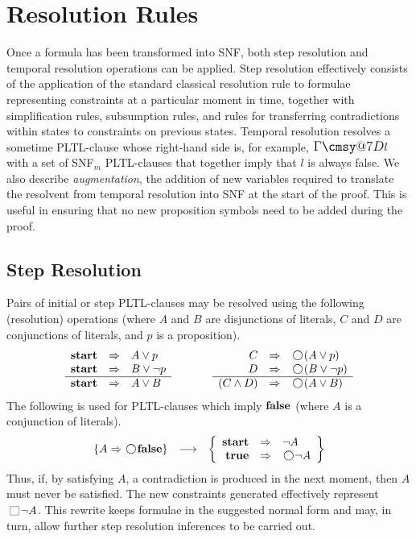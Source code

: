 \documentclass[nohyperref]{acmtrans2f}
\makeatletter
\def\sometime{\mathord{\hbox{\large$\mathchar"0\cmsy@7D$}}}
\newcommand{\always}{\raisebox{-.2ex}{
                           \mbox{\unitlength=0.9ex
                           \begin{picture}(2,2)
                           \linethickness{0.06ex}
                           \put(0,0){\line(1,0){2}}
                           \put(0,2){\line(1,0){2}}
                           \put(0,0){\line(0,1){2}}
                           \put(2,0){\line(0,1){2}}
                           \end{picture}}}
                          \,}
\newcommand{\next}{\!\raisebox{-.2ex}{ %
                        \mbox{\unitlength=0.9ex
                        \begin{picture}(2,2)
                        \linethickness{0.06ex}
                        \put(1,1){\circle{2}} %
                        \end{picture}}}       %
                        \,}
\def\ltrue{\hbox{\rm\bf true}}
\def\lfalse{\hbox{\rm\bf false}}
\def\lstart{\hbox{\rm\bf start}}
\makeatother
\begin{document}
\section{Resolution Rules}
\label{res.rules}
%
Once a formula has been transformed into SNF, both step resolution and
temporal resolution operations can be applied.
Step resolution effectively
consists of the application of the standard classical resolution rule
to formulae representing constraints at a particular moment in time,
together with simplification rules, subsumption rules, and rules for
transferring contradictions within states to constraints on previous
states. Temporal resolution resolves a sometime PLTL-clause whose
right-hand side is, for example, $\sometime l$  with a set of SNF$_m$
PLTL-clauses 
that together imply that $l$ is always false. We  also describe
{\em augmentation}, the addition of new variables required to translate the
resolvent from temporal resolution into SNF at the start of the
proof. This is useful in ensuring that no new proposition symbols need to
be added during the 
proof. 
%
\subsection{Step Resolution}
%
 Pairs of initial or step PLTL-clauses may be resolved using
the following (resolution) operations (where $A$ and $B$ are disjunctions
of literals, $C$ and $D$ are conjunctions of literals, and $p$ is a
proposition). 
%
$$\begin{array}{rcl}
	      \lstart & \Rightarrow & A \lor p \\
	      \lstart  & \Rightarrow & B \lor \neg p \\ \hline
	      \lstart & \Rightarrow & A \lor B
\end{array}
\mbox{~~~~~~~~~~~}
\begin{array}{rcl}
	       C & \Rightarrow & \next(A \lor p) \\
	       D & \Rightarrow & \next(B \lor \neg p) \\ \hline
	       (C  \land D) & \Rightarrow & \next(A \lor B)
\end{array}$$
%
The following is used for PLTL-clauses which imply $\lfalse$ (where $A$ is
a conjunction of literals).
%
$$\begin{array}{rcl}
\{ A  \Rightarrow  \next \lfalse \} & \longrightarrow & 
\left \{
\begin{array}{rcl}
\lstart & \Rightarrow & \neg A \\
\ltrue & \Rightarrow & \next\neg A
\end{array}
\right \}
\end{array}$$
%
Thus, if, by satisfying $A$, a contradiction is produced in the next
moment, then $A$ must never be satisfied. The new constraints
generated effectively represent $\always\neg A$. This rewrite keeps
formulae in the suggested normal form and may, in turn, allow
further step resolution inferences to be carried out.
\end{document}
